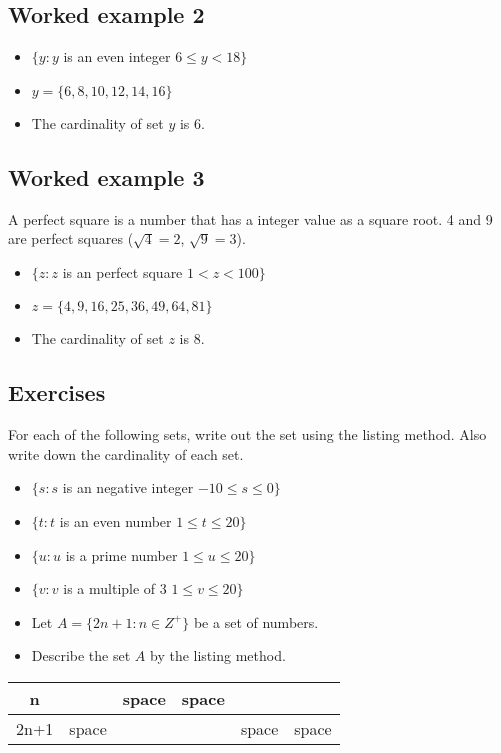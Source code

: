 \documentclass[11pt,a4paper,titlepage,oneside,openany]{article}
\numberwithin{equation}{section}
\numberwithin{algorithm}{section}
\numberwithin{figure}{section}
\numberwithin{table}{section}
\begin{document}
\subsection*{Worked example 2}
\begin{itemize}
\item $\{ y : y $ is an even integer $ 6 \leq y < 18 \}$
\item $y = \{6,8,10,12,14,16\}$
\item The cardinality of set $y$ is 6.
\end{itemize}

\subsection*{Worked example 3}
A perfect square is a number that has a integer value as a
square root. 4 and 9 are perfect squares ($\sqrt{4} = 2$,
$\sqrt{9} = 3$).
\begin{itemize}
\item $\{ z : z $ is an perfect square $ 1 < z < 100 \}$
\item $z = \{4,9,16,25,36,49,64,81\}$
\item The cardinality of set $z$ is 8.
\end{itemize}


\subsection*{Exercises}
For each of the following sets, write out the set using the listing method.
Also write down the cardinality of each set.

\begin{itemize} 
\item $\{ s : s $ is an negative integer $ -10 \leq s \leq 0 \}$
\item $\{ t : t $ is an even number $ 1 \leq t \leq 20 \}$
\item $\{ u : u $ is a prime number $ 1 \leq u \leq 20 \}$
\item $\{ v : v $ is a multiple of 3 $ 1 \leq v \leq 20 \}$
\end{itemize}
\newpage
\begin{itemize}
\item Let $A = \{2n+1 : n \in Z^{+}\}$ be a set of numbers.
\item Describe the set $A$ by the listing method.
\end{itemize} 
\begin{center}
\begin{tabular}{|c|c|c|c|c|c|}
\hline n &  &{\color{white} space}  & {\color{white} space} &  &  \\ 
\hline 2n+1 &{\color{white} space}  &  &  & {\color{white} space} &{\color{white} space}  \\ 
\hline 
\end{tabular} 
\end{center}
\end{document}
